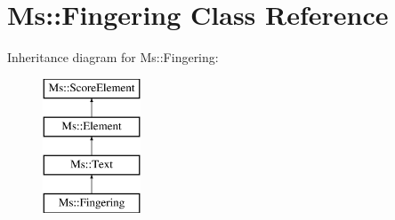 \hypertarget{class_ms_1_1_fingering}{}\section{Ms\+:\+:Fingering Class Reference}
\label{class_ms_1_1_fingering}
Inheritance diagram for Ms\+:\+:Fingering\+:\begin{figure}[H]
\begin{center}
\leavevmode
\includegraphics[height=4.000000cm]{class_ms_1_1_fingering}
\end{center}
\end{figure}

